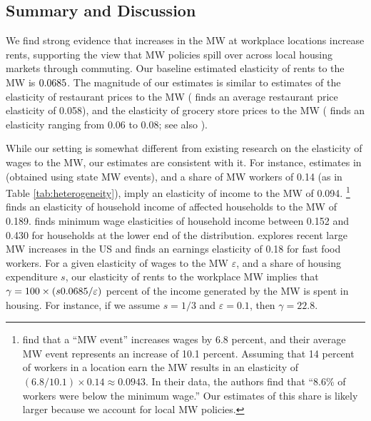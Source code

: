 \subsection{Summary and Discussion}
\label{sec:results_discussion}

We find strong evidence that increases in the MW at workplace locations 
increase rents, supporting the view that MW policies spill over across local
housing markets through commuting.
Our baseline estimated elasticity of rents to the MW is $0.0685$.
The magnitude of our estimates is similar to estimates of the elasticity of 
restaurant prices to the MW 
(\cite{AllegrettoReich2018} finds an average restaurant price elasticity of 0.058),
and the elasticity of grocery store prices to the MW 
(\cite{Leung2021} finds an elasticity ranging from 0.06 to 0.08; see also 
\cite{RenkinEtAl2020}).

While our setting is somewhat different from existing research on the 
elasticity of wages to the MW, our estimates are consistent with it.
For instance, estimates in \textcite{CegnizEtAl2019} (obtained using state MW 
events), and a share of MW workers of 0.14 (as in Table 
\ref{tab:heterogeneity}), imply an elasticity of income to the MW of 0.094.%
\footnote{\textcite[][Table I]{CegnizEtAl2019} find that a ``MW event'' 
    increases wages by 6.8 percent, and their average MW event 
    represents an increase of 10.1 percent.
    Assuming that 14 percent of workers in a location earn the MW results 
    in an elasticity of $(6.8/10.1)\times 0.14 \approx 0.0943$.
    In their data, the authors find that ``8.6\% of workers were below the 
    minimum wage.''
    Our estimates of this share is likely larger because we account for local 
    MW policies.}
\textcite[][Table 1]{Hughes2020} finds an elasticity of household income of 
affected households to the MW of 0.189.
\textcite{Dube2019Income} finds minimum wage elasticities of household income 
between 0.152 and 0.430 for households at the lower end of the distribution.
\textcite{WiltshireEtAl2023} explores recent large MW increases in the US and 
finds an earnings elasticity of 0.18 for fast food workers.
For a given elasticity of wages to the MW $\varepsilon$, and a share of housing 
expenditure $s$, our elasticity of rents to the workplace MW implies that
$\gamma = 100 \times \left(s 0.0685 /\varepsilon\right)$ percent 
of the income generated by the MW is spent in housing.
For instance, if we assume $s=1/3$ and $\varepsilon=0.1$, then $\gamma=22.8$.

